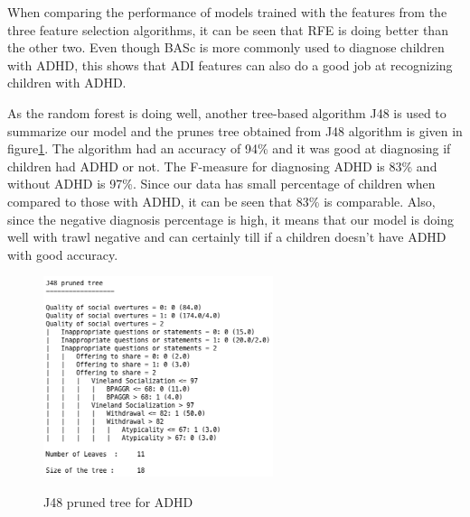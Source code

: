 When comparing the performance of models trained with the features from the three feature selection algorithms, it can be seen that RFE is doing better than the other two. Even though BASc is more commonly used to diagnose children with ADHD, this shows that ADI features can also do a good job at recognizing children with ADHD. 

As the random forest is doing well, another tree-based algorithm J48 is used to summarize our model and the prunes tree obtained from J48 algorithm is given in figure\ref{fig:64}. The algorithm had an accuracy of 94\% and it was good at diagnosing if children had ADHD or not. The F-measure for diagnosing ADHD is 83\% and without ADHD is 97\%. Since our data has small percentage of children when compared to those with ADHD, it can be seen that 83\% is comparable. Also, since the negative diagnosis percentage is high, it means that our model is doing well with trawl negative and can certainly till if a children doesn't have ADHD with good accuracy.
\begin{figure}
\centering
  {\includegraphics[width=0.6\textwidth]{Figures/Figure_6_4.png}}
  \caption{ J48 pruned tree for ADHD }
  \label{fig:64}
\end{figure}

